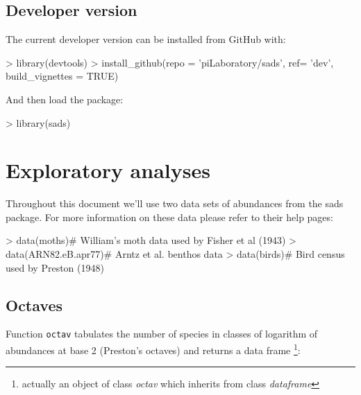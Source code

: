 \documentclass[11pt, A4]{article}
\newcommand{\code}[1]{\texttt{#1}}
\begin{document}
\subsection{Developer version}
\label{sec:developer-version}

The current developer version can be installed from GitHub with:

\begin{Schunk}
\begin{Sinput}
> library(devtools)
> install_github(repo = 'piLaboratory/sads', ref= 'dev', build_vignettes = TRUE)
\end{Sinput}
\end{Schunk}

And then load the package:

\begin{Schunk}
\begin{Sinput}
> library(sads)
\end{Sinput}
\end{Schunk}

\section{Exploratory analyses}
\label{sec:analise-exploratoria}

Throughout this document we'll use two data sets of abundances from the sads
package. For more information on these data please refer to their help
pages: 

\begin{Schunk}
\begin{Sinput}
> data(moths)# William's moth data used by Fisher et al (1943)
> data(ARN82.eB.apr77)# Arntz et al. benthos data
> data(birds)# Bird census used by Preston (1948)
\end{Sinput}
\end{Schunk}

\subsection{Octaves}
\label{sec:oitavas}

Function \code{octav} tabulates the number of species in classes
of logarithm of abundances at base 2 (Preston's octaves) and returns a data frame 
\footnote{actually an object of class \emph{octav} which inherits from class \emph{dataframe}}:
\end{document}
